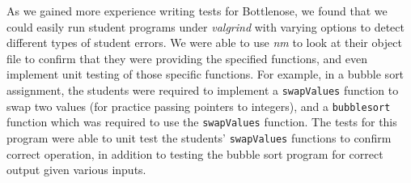 As we gained more experience writing tests for Bottlenose, we found that we
could easily run student programs under \textit{valgrind} with varying options
to detect different types of student errors. We were able to use \textit{nm}
to look at their object file to confirm that they were providing the specified
functions, and even implement unit testing of those specific functions. For
example, in a bubble sort assignment, the students were required to implement
a \texttt{swapValues} function to swap two values (for practice passing
pointers to integers), and a \texttt{bubblesort} function which was required
to use the \texttt{swapValues} function. The tests for this program were able
to unit test the students' \texttt{swapValues} functions to confirm correct
operation, in addition to testing the bubble sort program for correct output
given various inputs.


